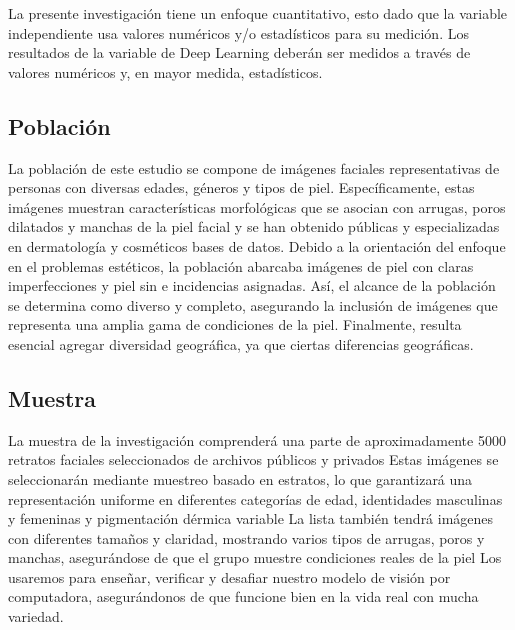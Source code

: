 La presente investigación tiene un enfoque cuantitativo, esto dado que la variable independiente usa valores numéricos y/o estadísticos para su medición. Los resultados de la variable de Deep Learning deberán ser medidos a través de valores numéricos y, en mayor medida, estadísticos.

\subsection{Población}
La población de este estudio se compone de imágenes faciales representativas de personas con diversas edades, géneros y tipos de piel. Específicamente, estas imágenes muestran características morfológicas que se asocian con arrugas, poros dilatados y manchas de la piel facial y se han obtenido públicas y especializadas en dermatología y cosméticos bases de datos. Debido a la orientación del enfoque en el problemas estéticos, la población abarcaba imágenes de piel con claras imperfecciones y piel sin e incidencias asignadas. Así, el alcance de la población se determina como diverso y completo, asegurando la inclusión de imágenes que representa una amplia gama de condiciones de la piel. Finalmente, resulta esencial agregar diversidad geográfica, ya que ciertas diferencias geográficas.
\subsection{Muestra}
La muestra de la investigación comprenderá una parte de aproximadamente 5000 retratos faciales seleccionados de archivos públicos y privados Estas imágenes se seleccionarán mediante muestreo basado en estratos, lo que garantizará una representación uniforme en diferentes categorías de edad, identidades masculinas y femeninas y pigmentación dérmica variable La lista también tendrá imágenes con diferentes tamaños y claridad, mostrando varios tipos de arrugas, poros y manchas, asegurándose de que el grupo muestre condiciones reales de la piel Los usaremos para enseñar, verificar y desafiar nuestro modelo de visión por computadora, asegurándonos de que funcione bien en la vida real con mucha variedad.
